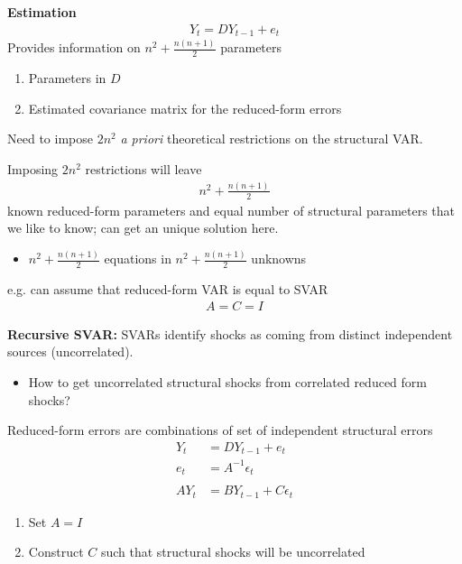 \documentclass{beamer}
\begin{document}
\begin{frame}
  \textbf{Estimation}\\  
  \begin{align}  
  Y_t = DY_{t-1} + e_t 
  \end{align}
  \medskip
  Provides information on $n^2+\frac{n(n+1)}{2}$ parameters
  \begin{enumerate}
    \item Parameters in $D$
    \item Estimated covariance matrix for the reduced-form errors
  \end{enumerate}
  \medskip
  Need to impose $2n^2$ \textit{a priori} theoretical restrictions on the structural VAR.  
\end{frame}

\begin{frame}
  Imposing $2n^2$ restrictions will leave 
  \begin{align}
    n^2+\frac{n(n+1)}{2}
  \end{align}
  \medskip
  known reduced-form parameters and equal number of structural parameters that we like to know; can get an unique solution here.
  \begin{itemize}
    \item $n^2+\frac{n(n+1)}{2}$ equations in $n^2+\frac{n(n+1)}{2}$ unknowns
  \end{itemize}
  \medskip
  e.g. can assume that reduced-form VAR is equal to SVAR
  \begin{align}
    A=C=I
  \end{align}
\end{frame}

\begin{frame}
  \textbf{Recursive SVAR:} SVARs identify shocks as coming from distinct independent sources (uncorrelated).
  \begin{itemize}
    \item How to get uncorrelated structural shocks from correlated reduced form shocks?
  \end{itemize}
  \medskip
  Reduced-form errors are combinations of set of independent structural errors
  \begin{align*}
    Y_t &= DY_{t-1} + e_t\\ 
    e_t &= A^{-1} \epsilon_t \\\\ 
    AY_t &= BY_{t-1} + C\epsilon_t  
  \end{align*}
  \begin{enumerate}
    \item Set $A = I$
    \item Construct $C$ such that structural shocks will be uncorrelated
  \end{enumerate}
\end{frame}
\end{document}
